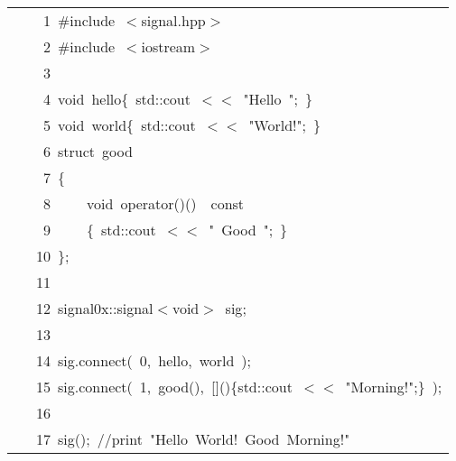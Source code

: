 \documentclass[9pt,onside,a4paper]{article}
\newcommand{\hlstd}[1]{\textcolor[rgb]{0.2,0,0.4}{#1}}
\newcommand{\hlnum}[1]{\textcolor[rgb]{0.2,0.73,0.02}{#1}}
\newcommand{\hlstr}[1]{\textcolor[rgb]{0.09,0.38,0.65}{#1}}
\newcommand{\hlslc}[1]{\textcolor[rgb]{0,0.4,0.2}{#1}}
\newcommand{\hlppc}[1]{\textcolor[rgb]{0.33,0.45,0.69}{#1}}
\newcommand{\hlopt}[1]{\textcolor[rgb]{0.33,0.33,0.33}{#1}}
\newcommand{\hllin}[1]{\textcolor[rgb]{0.6,0.6,0.6}{#1}}
\newcommand{\hlkwb}[1]{\textcolor[rgb]{0.96,0.55,0.14}{#1}}
\newcommand{\hlkwc}[1]{\textcolor[rgb]{0,0,1}{#1}}
\newcommand{\hlkwd}[1]{\textcolor[rgb]{0.82,0.11,0.93}{#1}}
\begin{document}
\ttfamily
\begin{center}
\begin{xtabular}{||l||}
\hline
\hlstd{}\hllin{\ \ \ \ 1\ }\hlppc{\#include\ $<$signal.hpp$>$}\\
\hllin{\ \ \ \ 2\ }\hlstd{}\hlppc{\#include\ $<$iostream$>$}\\
\hllin{\ \ \ \ 3\ }\hlstd{}\\
\hllin{\ \ \ \ 4\ }\hlkwb{void\ }\hlstd{hello}\hlopt{\{\ }\hlstd{std}\hlopt{::}\hlstd{cout\ }\hlopt{$<$$<$\ }\hlstd{}\hlstr{"Hello\ "}\hlstd{}\hlopt{;\ \}}\\
\hllin{\ \ \ \ 5\ }\hlstd{}\hlkwb{void\ }\hlstd{world}\hlopt{\{\ }\hlstd{std}\hlopt{::}\hlstd{cout\ }\hlopt{$<$$<$\ }\hlstd{}\hlstr{"World!"}\hlstd{}\hlopt{;\ \}}\\
\hllin{\ \ \ \ 6\ }\hlstd{}\hlkwb{struct\ }\hlstd{good}\\
\hllin{\ \ \ \ 7\ }\hlopt{\{}\\
\hllin{\ \ \ \ 8\ }\hlstd{}\hlstd{\ \ \ \ }\hlstd{}\hlkwb{void\ }\hlstd{}\hlkwc{operator}\hlstd{}\hlopt{()()}\hlstd{\ \ }\hlopt{}\hlstd{}\hlkwb{const}\\
\hllin{\ \ \ \ 9\ }\hlstd{}\hlstd{\ \ \ \ }\hlstd{}\hlopt{\{\ }\hlstd{std}\hlopt{::}\hlstd{cout\ }\hlopt{$<$$<$\ }\hlstd{}\hlstr{"\ Good\ "}\hlstd{}\hlopt{;\ \}}\\
\hllin{\ \ \ 10\ }\hlstd{}\hlopt{\};}\\
\hllin{\ \ \ 11\ }\hlstd{}\\
\hllin{\ \ \ 12\ }\hlstd{signal0x}\hlopt{::}\hlstd{signal}\hlopt{$<$}\hlstd{}\hlkwb{void}\hlstd{}\hlopt{$>$\ }\hlstd{sig}\hlopt{;}\\
\hllin{\ \ \ 13\ }\hlstd{}\\
\hllin{\ \ \ 14\ }\hlstd{sig}\hlopt{.}\hlstd{}\hlkwd{connect}\hlstd{}\hlopt{(\ }\hlstd{}\hlnum{0}\hlstd{}\hlopt{,\ }\hlstd{hello}\hlopt{,\ }\hlstd{world\ }\hlopt{);}\\
\hllin{\ \ \ 15\ }\hlstd{sig}\hlopt{.}\hlstd{}\hlkwd{connect}\hlstd{}\hlopt{(\ }\hlstd{}\hlnum{1}\hlstd{}\hlopt{,\ }\hlstd{good}\hlopt{(),\ {[}{]}()\{}\hlstd{std}\hlopt{::}\hlstd{cout\ }\hlopt{$<$$<$\ }\hlstd{}\hlstr{"Morning!"}\hlstd{}\hlopt{;\}\ );}\\
\hllin{\ \ \ 16\ }\hlstd{}\\
\hllin{\ \ \ 17\ }\hlkwd{sig}\hlstd{}\hlopt{();\ }\hlstd{}\hlslc{//print\ "Hello\ World!\ Good\ Morning!"}\hlstd{}\\
\hline
\end{xtabular}
\end{center}
\normalfont
\normalsize
\end{document}
